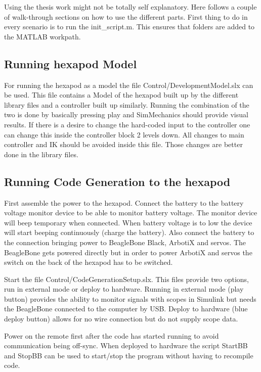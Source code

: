 Using the thesis work might not be totally self explanatory.
Here follows a couple of walk-through sections on how to use the different parts.
First thing to do in every scenario is to run the init{\_}script.m.
This ensures that folders are added to the MATLAB workpath.

\subsection{Running hexapod Model}
For running the hexapod as a model the file Control/DevelopmentModel.slx can be used.
This file contains a Model of the hexapod built up by the different library files and a controller built up similarly.
Running the combination of the two is done by basically pressing play and SimMechanics should provide visual results.
If there is a desire to change the hard-coded input to the controller one can change this inside the controller block 2 levels down.
All changes to main controller and IK should be avoided inside this file.
Those changes are better done in the library files.

\subsection{Running Code Generation to the hexapod}
First assemble the power to the hexapod.
Connect the battery to the battery voltage monitor device to be able to monitor battery voltage.
The monitor device will beep temporary when connected.
When battery voltage is to low the device will start beeping continuously (charge the battery).
Also connect the battery to the connection bringing power to BeagleBone Black, ArbotiX and servos.
The BeagleBone gets powered directly but in order to power ArbotiX and servos the switch on the back of the hexapod has to be switched.

Start the file Control/CodeGenerationSetup.slx.
This files provide two options, run in external mode or deploy to hardware.
Running in external mode (play button) provides the ability to monitor signals with scopes in Simulink but needs the BeagleBone connected to the computer by USB.
Deploy to hardware (blue deploy button) allows for no wire connection but do not supply scope data.

Power on the remote first after the code has started running to avoid communication being off-sync.
When deployed to hardware the script StartBB and StopBB can be used to start/stop the program without having to recompile code.

